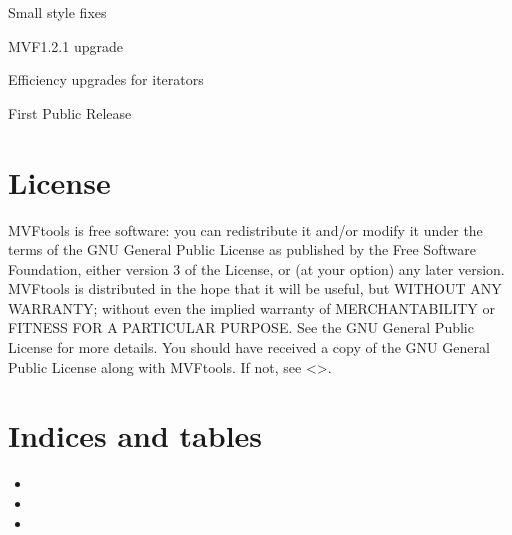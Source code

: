 \documentclass[letterpaper,11pt,english]{sphinxmanual}
\begin{document}

Small style fixes


MVF1.2.1 upgrade


Efficiency upgrades for iterators


First Public Release


\chapter{License}
\label{\detokenize{version:license}}
MVFtools is free software: you can redistribute it and/or modify
it under the terms of the GNU General Public License as published by
the Free Software Foundation, either version 3 of the License, or
(at your option) any later version.
MVFtools is distributed in the hope that it will be useful,
but WITHOUT ANY WARRANTY; without even the implied warranty of
MERCHANTABILITY or FITNESS FOR A PARTICULAR PURPOSE.  See the
GNU General Public License for more details.
You should have received a copy of the GNU General Public License
along with MVFtools.  If not, see \textless{}\textgreater{}.


\chapter{Indices and tables}
\label{\detokenize{index:indices-and-tables}}\begin{itemize}
\item {} 

\item {} 

\item {} 

\end{itemize}



\renewcommand{\indexname}{Index}
\printindex
\end{document}
